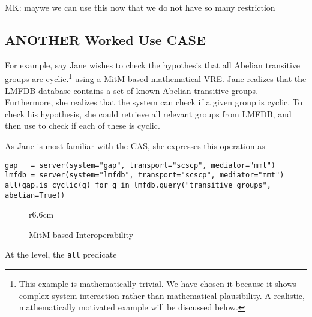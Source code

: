 \begin{oldpart}{MK: maywe we can use this now that we do not have so many restriction}
\subsection{ANOTHER Worked Use CASE}
  For example, say Jane wishes to check the hypothesis that all Abelian transitive groups
  are cyclic.\footnote{This example is mathematically trivial.  We have chosen it because
    it shows complex system interaction rather than mathematical plausibility.  A
    realistic, mathematically motivated example will be discussed below.}  using a
  MitM-based mathematical VRE.  Jane realizes that the LMFDB database contains a set of
  known Abelian transitive groups.  Furthermore, she realizes that the \GAP system can
  check if a given group is cyclic.  To check his hypothesis, she could retrieve all
  relevant groups from LMFDB, and then use \GAP to check if each of these is cyclic.

As Jane is most familiar with the \Sage CAS, she expresses this operation as
\begin{lstlisting}
gap   = server(system="gap", transport="scscp", mediator="mmt")
lmfdb = server(system="lmfdb", transport="scscp", mediator="mmt")
all(gap.is_cyclic(g) for g in lmfdb.query("transitive_groups", abelian=True))
\end{lstlisting}

\begin{wrapfigure}r{6.6cm}\vspace*{-2em}
  \vspace*{-1em}
  \caption{MitM-based Interoperability}\label{fig:mitmcomm}\vspace*{-1em}
\end{wrapfigure}

At the \Sage level, the \lstinline|all| predicate 


\end{oldpart}
